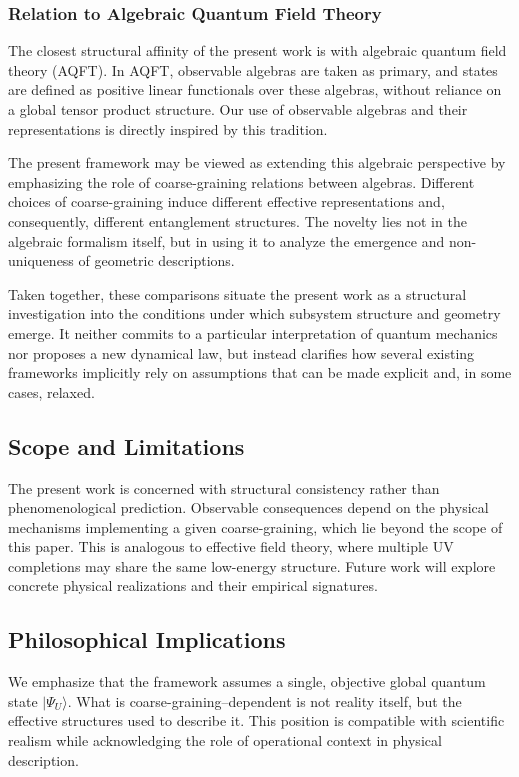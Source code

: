 \documentclass[12pt,a4paper,openany]{book}
\begin{document}
\subsubsection{Relation to Algebraic Quantum Field Theory}

The closest structural affinity of the present work is with algebraic quantum field theory (AQFT).
In AQFT, observable algebras are taken as primary, and states are defined as positive linear functionals over these algebras, without reliance on a global tensor product structure.
Our use of observable algebras and their representations is directly inspired by this tradition.

The present framework may be viewed as extending this algebraic perspective by emphasizing the role of coarse-graining relations between algebras.
Different choices of coarse-graining induce different effective representations and, consequently, different entanglement structures.
The novelty lies not in the algebraic formalism itself, but in using it to analyze the emergence and non-uniqueness of geometric descriptions.

Taken together, these comparisons situate the present work as a structural investigation into the conditions under which subsystem structure and geometry emerge.
It neither commits to a particular interpretation of quantum mechanics nor proposes a new dynamical law, but instead clarifies how several existing frameworks implicitly rely on assumptions that can be made explicit and, in some cases, relaxed.

\subsection{Scope and Limitations}

The present work is concerned with structural consistency rather than phenomenological prediction. 
Observable consequences depend on the physical mechanisms implementing a given coarse-graining, which lie beyond the scope of this paper. 
This is analogous to effective field theory, where multiple UV completions may share the same low-energy structure. 
Future work will explore concrete physical realizations and their empirical signatures.

\subsection{Philosophical Implications}

We emphasize that the framework assumes a single, objective global quantum state $|\Psi_U\rangle$. 
What is coarse-graining--dependent is not reality itself, but the effective structures used to describe it. 
This position is compatible with scientific realism while acknowledging the role of operational context in physical description.
\end{document}

